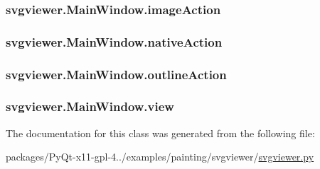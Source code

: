 \subsubsection[{image\+Action}]{\setlength{\rightskip}{0pt plus 5cm}svgviewer.\+Main\+Window.\+image\+Action}\label{classsvgviewer_1_1MainWindow_aae0449e623a5d4addc0353bad2855acb}
\hypertarget{classsvgviewer_1_1MainWindow_a35aa36b98ed3a8a656a6177a0f7b61fc}{}
\subsubsection[{native\+Action}]{\setlength{\rightskip}{0pt plus 5cm}svgviewer.\+Main\+Window.\+native\+Action}\label{classsvgviewer_1_1MainWindow_a35aa36b98ed3a8a656a6177a0f7b61fc}
\hypertarget{classsvgviewer_1_1MainWindow_a4f7efeb7a9f9eda4475fe320edce546e}{}
\subsubsection[{outline\+Action}]{\setlength{\rightskip}{0pt plus 5cm}svgviewer.\+Main\+Window.\+outline\+Action}\label{classsvgviewer_1_1MainWindow_a4f7efeb7a9f9eda4475fe320edce546e}
\hypertarget{classsvgviewer_1_1MainWindow_af4473a7b451e42396df79daf3158449b}{}
\subsubsection[{view}]{\setlength{\rightskip}{0pt plus 5cm}svgviewer.\+Main\+Window.\+view}\label{classsvgviewer_1_1MainWindow_af4473a7b451e42396df79daf3158449b}


The documentation for this class was generated from the following file\+:\begin{DoxyCompactItemize}
\item 
packages/\+Py\+Qt-\/x11-\/gpl-\/4../examples/painting/svgviewer/\hyperlink{svgviewer_8py}{svgviewer.\+py}\end{DoxyCompactItemize}
